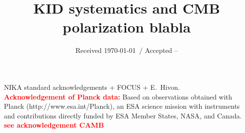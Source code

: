 \documentclass[twocolumn, traditabstract]{aa}
\newcommand{\todo}[1]{\textcolor{red}{\textbf{#1}}}
\begin{document}
\title{KID systematics and CMB polarization blabla}

\date{Received \today \ / Accepted --}
	
\tableofcontents
\maketitle






%

\clearpage
\newpage

 


\begin{acknowledgements}
NIKA standard acknowledgements + FOCUS + E.~Hivon.\\
\todo{Acknowledgement of Planck data:} Based on observations obtained with Planck
(http://www.esa.int/Planck), an ESA science mission with instruments and
contributions directly funded by ESA Member States, NASA, and Canada.
\todo{see acknowledgement CAMB}
\end{acknowledgements}
\end{document}
